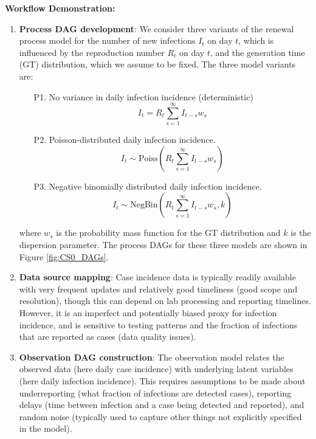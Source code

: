 \documentclass{article}
\begin{document}
\textbf{Workflow Demonstration:}
\begin{enumerate}
    \item \textbf{Process DAG development}: We consider three variants of the renewal process model for the number of new infections $I_t$ on day $t$, which is influenced by the reproduction number $R_t$ on day $t$, and the generation time (GT) distribution, which we assume to be fixed. The three model variants are:
\begin{itemize}
    \item[P1.] No variance in daily infection incidence (deterministic)
    \begin{equation} \label{eq:infections_P1}
        I_t = R_t \sum_{s=1}^\infty I_{t-s}w_s 
    \end{equation}
    \item[P2.] Poisson-distributed daily infection incidence.
        \begin{equation} \label{eq:infections_P2}
        I_t \sim \mathrm{Poiss}\left( R_t \sum_{s=1}^\infty I_{t-s}w_s  \right)
    \end{equation}
    \item[P3.] Negative binomially distributed daily infection incidence. 
            \begin{equation} \label{eq:infections_P3}
        I_t \sim \mathrm{NegBin}\left( R_t \sum_{s=1}^\infty I_{t-s}w_s, k  \right)
    \end{equation}
\end{itemize}
where $w_s$ is the probability mass function for the GT distribution and $k$ is the dispersion parameter. 
The process DAGs for these three models are shown in Figure \ref{fig:CS0_DAGs}.

 

\item \textbf{Data source mapping}: Case incidence data is typically readily available with very frequent updates and relatively good timeliness (good scope and resolution), though this can depend on lab processing and reporting timelines. However, it is an imperfect and potentially biased proxy for infection incidence, and is sensitive to testing patterns and the fraction of infections that are reported as cases (data quality issues). 


\item \textbf{Observation DAG construction}: The observation model relates the observed data (here daily case incidence) with underlying latent variables (here daily infection incidence). 
This requires assumptions to be made about underreporting (what fraction of infections are detected cases), reporting delays (time between infection and a case being detected and reported), and random noise (typically used to capture other things not explicitly specified in the model).


\end{enumerate}
\end{document}
